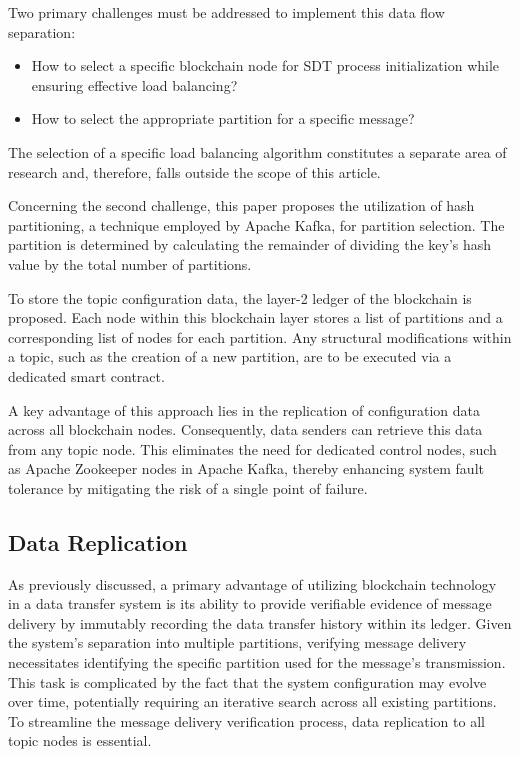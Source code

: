 \documentclass[10pt]{llncs}
\begin{document}
Two primary challenges must be addressed to implement this data flow separation:

\begin{itemize}
    \item How to select a specific blockchain node for SDT process initialization while ensuring effective load balancing?
    \item How to select the appropriate partition for a specific message?
\end{itemize}

The selection of a specific load balancing algorithm constitutes a separate area of research and, therefore, falls outside the scope of this article.

Concerning the second challenge, this paper proposes the utilization of hash partitioning, a technique employed by Apache Kafka, for partition selection.  
The partition is determined by calculating the remainder of dividing the key's hash value by the total number of partitions.

To store the topic configuration data, the layer-2 ledger of the blockchain is proposed. 
Each node within this blockchain layer stores a list of partitions and a corresponding list of nodes for each partition. 
Any structural modifications within a topic, such as the creation of a new partition, are to be executed via a dedicated smart contract.

A key advantage of this approach lies in the replication of configuration data across all blockchain nodes. 
Consequently, data senders can retrieve this data from any topic node. 
This eliminates the need for dedicated control nodes, such as Apache Zookeeper nodes in Apache Kafka, thereby enhancing system fault tolerance by mitigating the risk of a single point of failure.


\subsection{Data Replication}\label{data-replication}
As previously discussed, a primary advantage of utilizing blockchain technology in a data transfer system is its ability to provide verifiable evidence of message delivery by immutably recording the data transfer history within its ledger.
 Given the system's separation into multiple partitions, verifying message delivery necessitates identifying the specific partition used for the message's transmission. 
 This task is complicated by the fact that the system configuration may evolve over time, potentially requiring an iterative search across all existing partitions.
 To streamline the message delivery verification process, data replication to all topic nodes is essential.
\end{document}
